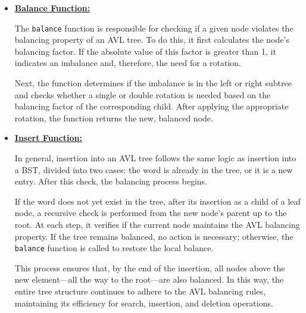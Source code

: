 \begin{itemize}
\begin{itemize}
\begin{center}
    \end{center}
    
  \end{itemize}

  \item \underline{\textbf{Balance Function:}}

  The \texttt{balance} function is responsible for checking if a given node violates the balancing property of an AVL tree. To do this, it first calculates the node's balancing factor. If the absolute value of this factor is greater than 1, it indicates an imbalance and, therefore, the need for a rotation.

  Next, the function determines if the imbalance is in the left or right subtree and checks whether a single or double rotation is needed based on the balancing factor of the corresponding child. After applying the appropriate rotation, the function returns the new, balanced node.

  \item \underline{\textbf{Insert Function:}}

  In general, insertion into an AVL tree follows the same logic as insertion into a BST, divided into two cases: the word is already in the tree, or it is a new entry. After this check, the balancing process begins.

  If the word does not yet exist in the tree, after its insertion as a child of a leaf node, a recursive check is performed from the new node's parent up to the root. At each step, it verifies if the current node maintains the AVL balancing property. If the tree remains balanced, no action is necessary; otherwise, the \texttt{balance} function is called to restore the local balance.

  This process ensures that, by the end of the insertion, all nodes above the new element---all the way to the root---are also balanced. In this way, the entire tree structure continues to adhere to the AVL balancing rules, maintaining its efficiency for search, insertion, and deletion operations.

\end{itemize}













